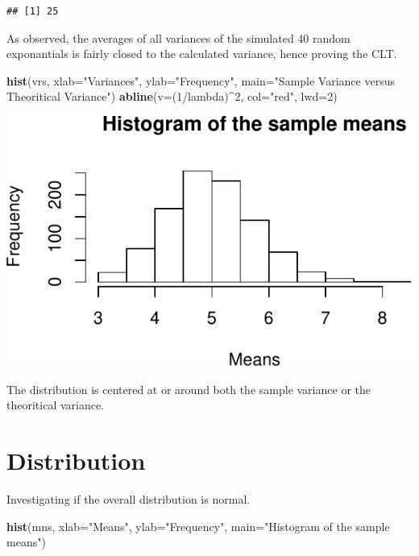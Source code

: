 \documentclass[]{article}
\newenvironment{Shaded}{\begin{snugshade}}{\end{snugshade}}
\newcommand{\KeywordTok}[1]{\textcolor[rgb]{0.13,0.29,0.53}{\textbf{{#1}}}}
\newcommand{\DataTypeTok}[1]{\textcolor[rgb]{0.13,0.29,0.53}{{#1}}}
\newcommand{\DecValTok}[1]{\textcolor[rgb]{0.00,0.00,0.81}{{#1}}}
\newcommand{\StringTok}[1]{\textcolor[rgb]{0.31,0.60,0.02}{{#1}}}
\newcommand{\NormalTok}[1]{{#1}}
\begin{document}
\begin{verbatim}
## [1] 25
\end{verbatim}

As observed, the averages of all variances of the simulated 40 random
exponantials is fairly closed to the calculated variance, hence proving
the CLT.

\begin{Shaded}
\begin{Highlighting}[]
\KeywordTok{hist}\NormalTok{(vrs, }\DataTypeTok{xlab=}\StringTok{"Variances"}\NormalTok{, }\DataTypeTok{ylab=}\StringTok{"Frequency"}\NormalTok{, }\DataTypeTok{main=}\StringTok{"Sample Variance versus Theoritical Variance"}\NormalTok{)}
\KeywordTok{abline}\NormalTok{(}\DataTypeTok{v=}\NormalTok{(}\DecValTok{1}\NormalTok{/lambda)^}\DecValTok{2}\NormalTok{, }\DataTypeTok{col=}\StringTok{"red"}\NormalTok{, }\DataTypeTok{lwd=}\DecValTok{2}\NormalTok{)}
\end{Highlighting}
\end{Shaded}

\includegraphics{statinference-courseproject-1-Question-1_files/figure-latex/unnamed-chunk-6-1.pdf}

The distribution is centered at or around both the sample variance or
the theoritical variance.

\section{Distribution}\label{distribution}

Investigating if the overall distribution is normal.

\begin{Shaded}
\begin{Highlighting}[]
\KeywordTok{hist}\NormalTok{(mns, }\DataTypeTok{xlab=}\StringTok{"Means"}\NormalTok{, }\DataTypeTok{ylab=}\StringTok{"Frequency"}\NormalTok{, }\DataTypeTok{main=}\StringTok{"Histogram of the sample means"}\NormalTok{)}
\end{Highlighting}
\end{Shaded}
\end{document}
